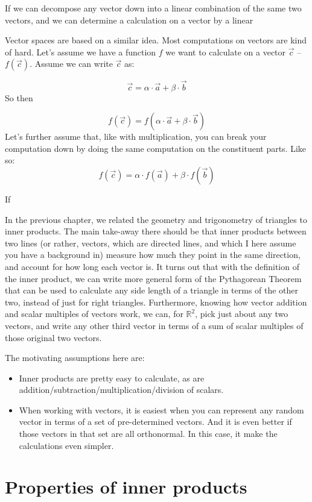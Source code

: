 \documentclass[
]{book}
\providecommand{\tightlist}{%
  \setlength{\itemsep}{0pt}\setlength{\parskip}{0pt}}
\begin{document}
If we can decompose any vector down into a linear combination of the same two vectors, and we can determine a calculation on a vector by a linear

Vector spaces are based on a similar idea. Most computations on vectors are kind of hard. Let's assume we have a function \(f\) we want to calculate on a vector \(\vec{c}\) -- \(f(\vec{c})\). Assume we can write \(\vec{c}\) as:

\[\vec{c} = \alpha\cdot\vec{a} + \beta\cdot\vec{b}\]
So then

\[f(\vec{c}) = f(\alpha\cdot\vec{a} + \beta\cdot\vec{b})\]
Let's further assume that, like with multiplication, you can break your computation down by doing the same computation on the constituent parts. Like so:
\[f(\vec{c}) = \alpha\cdot f(\vec{a}) + \beta\cdot f(\vec{b})\]

If

In the previous chapter, we related the geometry and trigonometry of triangles to inner products. The main take-away there should be that inner products between two lines (or rather, vectors, which are directed lines, and which I here assume you have a background in) measure how much they point in the same direction, and account for how long each vector is. It turns out that with the definition of the inner product, we can write more general form of the Pythagorean Theorem that can be used to calculate any side length of a triangle in terms of the other two, instead of just for right triangles. Furthermore, knowing how vector addition and scalar multiples of vectors work, we can, for \(\mathbb{R}^2\), pick just about any two vectors, and write any other third vector in terms of a sum of scalar multiples of those original two vectors.

The motivating assumptions here are:

\begin{itemize}
\tightlist
\item
  Inner products are pretty easy to calculate, as are addition/subtraction/multiplication/division of scalars.
\item
  When working with vectors, it is easiest when you can represent any random vector in terms of a set of pre-determined vectors. And it is even better if those vectors in that set are all orthonormal. In this case, it make the calculations even simpler.
\end{itemize}

\hypertarget{properties-of-inner-products}{%
\section{Properties of inner products}\label{properties-of-inner-products}}
\end{document}
